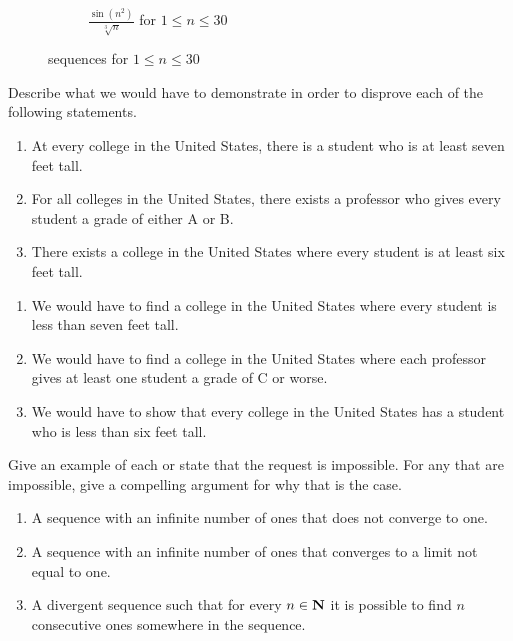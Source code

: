 \documentclass{lew98_solutions}
\begin{document}
\begin{solution}
\begin{figure}
\begin{subfigure}{0.75\textwidth}
            \caption{\( \tfrac{\sin(n^2)}{\sqrt[3]{n}} \) for \( 1 \leq n \leq 30 \)}
        \end{subfigure}
        \caption{ sequences for \( 1 \leq n \leq 30 \)}
        \label{fig:ex2.2.2}
    \end{figure}
\end{solution}

\begin{exercise}
\label{ex:2.2.3}
    Describe what we would have to demonstrate in order to disprove each of the following statements.
    \begin{enumerate}
        \item At every college in the United States, there is a student who is at least seven feet tall.

        \item For all colleges in the United States, there exists a professor who gives every student a grade of either A or B.

        \item There exists a college in the United States where every student is at least six feet tall.
    \end{enumerate}
\end{exercise}

\begin{solution}
    \begin{enumerate}
        \item We would have to find a college in the United States where every student is less than seven feet tall.

        \item We would have to find a college in the United States where each professor gives at least one student a grade of C or worse.

        \item We would have to show that every college in the United States has a student who is less than six feet tall.
    \end{enumerate}
\end{solution}

\begin{exercise}
\label{ex:2.2.4}
    Give an example of each or state that the request is impossible. For any that are impossible, give a compelling argument for why that is the case.
    \begin{enumerate}
        \item A sequence with an infinite number of ones that does not converge to one.

        \item A sequence with an infinite number of ones that converges to a limit not equal to one.

        \item A divergent sequence such that for every \( n \in \mathbf{N} \) it is possible to find \( n \) consecutive ones somewhere in the sequence.
    \end{enumerate}
\end{exercise}
\end{document}
